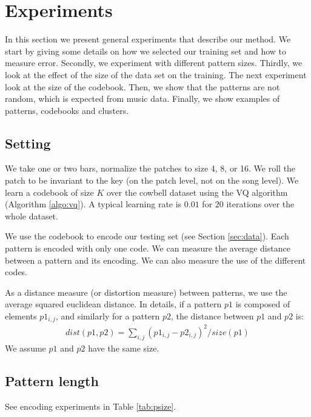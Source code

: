 \documentclass{article}
\begin{document}
\section{Experiments}\label{sec:experiments}
In this section we present general experiments that describe our method.
We start by giving some details on how we selected our training set and
how to measure error. Secondly, we experiment with different pattern sizes.
Thirdly, we look at the effect of the size of the
data set on the training. The next experiment look at the size of the
codebook. Then, we show that the patterns are not random,
which is expected from music data. Finally, we show examples of patterns,
codebooks and clusters.


\subsection{Setting}\label{ssec:setting}
We take one or two bars, normalize the patches to size 4, 8, or 16.
We roll the patch to be invariant to the key (on the patch level, not on
the song level). We learn a codebook of size $K$ over the cowbell dataset 
using the VQ algorithm (Algorithm \ref{algo:vq}). A typical learning rate 
is $0.01$ for $20$ iterations over the whole dataset.

We use the codebook to encode our testing set (see Section \ref{sec:data}).
Each pattern is encoded with only one code. We can measure the average
distance between a pattern and its encoding. We can also measure the use
of the different codes.

As a distance measure (or distortion measure) between patterns, we use
the average squared euclidean distance. In details, if a pattern $p1$
is composed of elements $p1_{i,j}$, and similarly for a pattern $p2$,
the distance between $p1$ and $p2$ is:
\begin{eqnarray}
  dist(p1,p2) = \sum_{i,j} (p1_{i,j} - p2_{i,j})^2 / size(p1)  \label{eq:dist}
\end{eqnarray}
We assume $p1$ and $p2$ have the same size.

\subsection{Pattern length}
See encoding experiments in Table \ref{tab:psize}.
\end{document}
